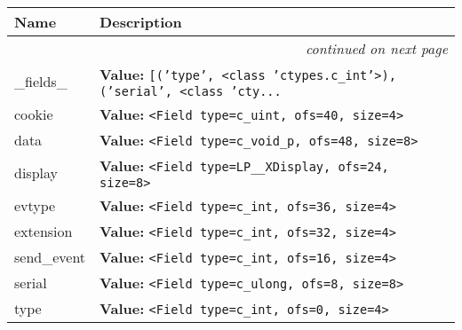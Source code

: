     \vspace{-1cm}
\hspace{\varindent}\begin{longtable}{|p{\varnamewidth}|p{\vardescrwidth}|l}
\cline{1-2}
\cline{1-2} \centering \textbf{Name} & \centering \textbf{Description}& \\
\cline{1-2}
\endhead\cline{1-2}\multicolumn{3}{r}{\small\textit{continued on next page}}\\\endfoot\cline{1-2}
\endlastfoot\raggedright \_\-f\-i\-e\-l\-d\-s\-\_\- & \raggedright \textbf{Value:} 
{\tt \texttt{[}\texttt{(}\texttt{'}\texttt{type}\texttt{'}\texttt{, }{\textless}class 'ctypes.c\_int'{\textgreater}\texttt{)}\texttt{, }\texttt{(}\texttt{'}\texttt{serial}\texttt{'}\texttt{, }{\textless}class 'cty\texttt{...}}&\\
\cline{1-2}
\raggedright c\-o\-o\-k\-i\-e\- & \raggedright \textbf{Value:} 
{\tt {\textless}Field type=c\_uint, ofs=40, size=4{\textgreater}}&\\
\cline{1-2}
\raggedright d\-a\-t\-a\- & \raggedright \textbf{Value:} 
{\tt {\textless}Field type=c\_void\_p, ofs=48, size=8{\textgreater}}&\\
\cline{1-2}
\raggedright d\-i\-s\-p\-l\-a\-y\- & \raggedright \textbf{Value:} 
{\tt {\textless}Field type=LP\_\_XDisplay, ofs=24, size=8{\textgreater}}&\\
\cline{1-2}
\raggedright e\-v\-t\-y\-p\-e\- & \raggedright \textbf{Value:} 
{\tt {\textless}Field type=c\_int, ofs=36, size=4{\textgreater}}&\\
\cline{1-2}
\raggedright e\-x\-t\-e\-n\-s\-i\-o\-n\- & \raggedright \textbf{Value:} 
{\tt {\textless}Field type=c\_int, ofs=32, size=4{\textgreater}}&\\
\cline{1-2}
\raggedright s\-e\-n\-d\-\_\-e\-v\-e\-n\-t\- & \raggedright \textbf{Value:} 
{\tt {\textless}Field type=c\_int, ofs=16, size=4{\textgreater}}&\\
\cline{1-2}
\raggedright s\-e\-r\-i\-a\-l\- & \raggedright \textbf{Value:} 
{\tt {\textless}Field type=c\_ulong, ofs=8, size=8{\textgreater}}&\\
\cline{1-2}
\raggedright t\-y\-p\-e\- & \raggedright \textbf{Value:} 
{\tt {\textless}Field type=c\_int, ofs=0, size=4{\textgreater}}&\\
\cline{1-2}
\end{longtable}

